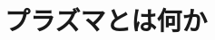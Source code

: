 \documentclass{report}
\begin{document}
  \maketitle
  \tableofcontents
  \chapter{プラズマとは何か}
    
\end{document}
